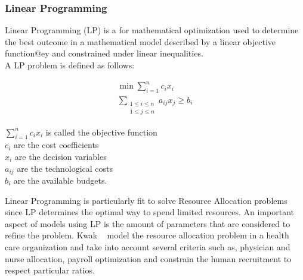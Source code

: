 \subsubsection{Linear Programming}

Linear Programming (LP) is a for mathematical optimization used to determine the best outcome in a mathematical model described by a linear objective function@ey and constrained under linear inequalities.
\\A LP problem is defined as follows:

\begin{myformula}
\begin{equation*}
    \begin{aligned}
    \min \sum\limits_{i=1}^n c_{i}x_i\\
    \sum_{\substack{1 \leqslant i \leqslant n \\  1 \leqslant j \leqslant n}} a_{ij}x_j \geqslant b_i
    \end{aligned}
\end{equation*}

$\sum\limits_{i=1}^n c_{i}x_i$ is called the objective function\\
$c_i$ are the cost coefficients\\
$x_i$ are the decision variables\\
$a_{ij}$ are the technological costs\\
$b_i$ are the available budgets.
\end{myformula}


Linear Programming is particularly fit to solve Resource Allocation problems since LP determines the optimal way to spend limited resources.
An important aspect of models using LP is the amount of parameters that are considered to refine the problem. 
Kwak \etal~\cite{lpmedical-kwak1997} model the resource allocation problem in a health care organization and take into account several criteria such as, physician and nurse allocation, payroll optimization and constrain the human recruitment to respect particular ratios.

